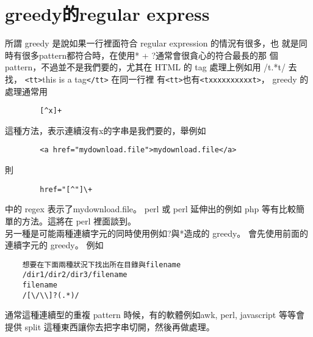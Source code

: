     \section{greedy的regular express}
	所謂 greedy 是說如果一行裡面符合 regular expression 的情況有很多，也
        就是同時有很多pattern都符合時，在使用* + ?通常會很貪心的符合最長的那
        個 pattern，不過並不是我們要的，尤其在 HTML 的 tag 處理上例如用 /t.*t/
        去找，
	\verb=<tt>=this is a tag\verb=</tt>= 在同一行裡
	有\verb=<tt>=也有\verb=<txxxxxxxxxxt>=， greedy 的處理通常用
        \begin{verbatim}
        [^x]+
        \end{verbatim}
        這種方法，表示連續沒有x的字串是我們要的，舉例如
        \begin{verbatim}
        <a href="mydownload.file">mydownload.file</a>
        \end{verbatim}
        則
        \begin{verbatim}
        href="[^"]\+
        \end{verbatim}
        中的 regex 表示了mydownload.file。 perl 或 perl 延伸出的例如 php
        等有比較簡單的方法。這將在 perl 裡面談到。
	\\
	另一種是可能兩種連續字元的同時使用例如?與*造成的 greedy。
	會先使用前面的連續字元的 greedy。
	例如
	\begin{verbatim}
	想要在下面兩種狀況下找出所在目錄與filename
	/dir1/dir2/dir3/filename
	filename
	/[\/\\]?(.*)/
	\end{verbatim}
	通常這種連續型的重複 pattern 時候，有的軟體例如awk, perl, javascript 
	等等會提供 split 這種東西讓你去把字串切開，然後再做處理。
